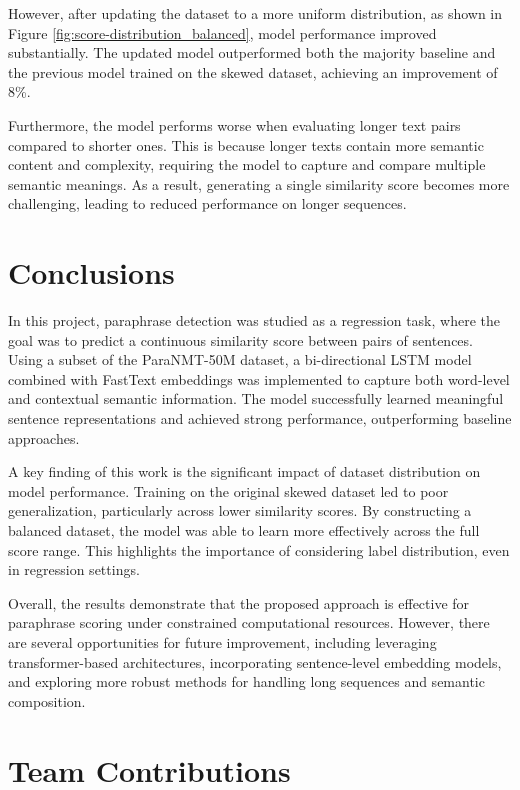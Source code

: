\documentclass[11pt]{article}
\begin{document}
However, after updating the dataset to a more uniform distribution,
as shown in Figure \ref{fig:score-distribution_balanced}, model performance improved
substantially. The updated model outperformed both the majority baseline and
the previous model trained on the skewed dataset, achieving an improvement of 8\%.

Furthermore, the model performs worse when evaluating longer text pairs
compared to shorter ones. This is because longer texts contain more semantic
content and complexity, requiring the model to capture and compare multiple
semantic meanings. As a result, generating a single similarity score
becomes more challenging, leading to reduced performance on longer sequences.

\section{Conclusions}

In this project, paraphrase detection was studied as a regression task, where the goal
was to predict a continuous similarity score between pairs of sentences.
Using a subset of the ParaNMT-50M dataset, a bi-directional LSTM model
combined with FastText embeddings was implemented to capture both word-level
and contextual semantic information. The model successfully learned meaningful
sentence representations and achieved strong performance, outperforming
baseline approaches.

A key finding of this work is the significant impact of dataset distribution
on model performance. Training on the original skewed dataset led to poor
generalization, particularly across lower similarity scores. By constructing
a balanced dataset, the model was able to learn more effectively across the
full score range. This highlights the importance of considering label
distribution, even in regression settings.

Overall, the results demonstrate that the proposed approach is effective
for paraphrase scoring under constrained computational resources.
However, there are several opportunities for future improvement,
including leveraging transformer-based architectures, incorporating
sentence-level embedding models, and exploring more robust methods
for handling long sequences and semantic composition.

\section*{Team Contributions}
\end{document}
